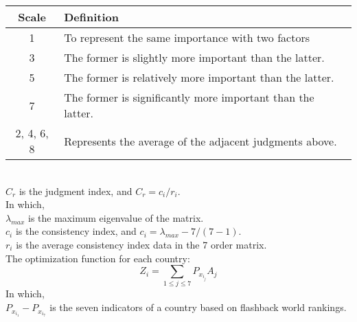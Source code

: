 \documentclass{mcmthesis}
\begin{document}
\begin{tabular}{c|l}
Scale & Definition \\
\hline
1 & To represent the same importance with two factors \\ 
3 & The former is slightly more important than the latter. \\
5 & The former is relatively more important than the latter. \\
7 & The former is significantly more important than the latter. \\ 
2, 4, 6, 8 & Represents the average of the adjacent judgments above. \\
\end{tabular} \\
$C_r$ is the judgment index, and $C_r=c_i / r_i$. \\
In which, \\
$\lambda_{max}$ is the maximum eigenvalue of the matrix. \\
$c_i$ is the consistency index, and $c_i=\lambda_{max}-7/(7-1)$. \\
$r_i$ is the average consistency index data in the 7 order matrix. \\
The optimization function for each country:
\begin{equation}
Z_i=\sum_{1\leq j \leq7}{P_{x_{i_j}} A_j}
\end{equation}
In which, \\
$P_{x_{i_1}}-P_{x_{i_7}}$ is the seven indicators of a country based on flashback world rankings.
\end{document}
